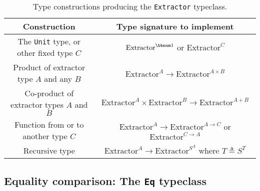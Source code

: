 \begin{table}
\begin{centering}
\begin{tabular}{|c|c|}
\hline 
\textbf{\footnotesize{}Construction} & \textbf{\footnotesize{}Type signature to implement}\tabularnewline
\hline 
\hline 
{\footnotesize{}The }\lstinline!Unit!{\footnotesize{} type, or other
fixed type $C$} & {\footnotesize{}$\text{Extractor}^{\bbnum 1}$ or $\text{Extractor}^{C}$}\tabularnewline
\hline 
{\footnotesize{}Product of extractor type $A$ and any $B$} & {\footnotesize{}$\text{Extractor}^{A}\rightarrow\text{Extractor}^{A\times B}$}\tabularnewline
\hline 
{\footnotesize{}Co-product of extractor types $A$ and $B$} & {\footnotesize{}$\text{Extractor}^{A}\times\text{Extractor}^{B}\rightarrow\text{Extractor}^{A+B}$}\tabularnewline
\hline 
{\footnotesize{}Function from or to another type $C$} & {\footnotesize{}$\text{Extractor}^{A}\rightarrow\text{Extractor}^{A\rightarrow C}$
or $\text{Extractor}^{C\rightarrow A}$}\tabularnewline
\hline 
{\footnotesize{}Recursive type} & {\footnotesize{}$\text{Extractor}^{A}\rightarrow\text{Extractor}^{S^{A}}$
where $T\triangleq S^{T}$}\tabularnewline
\hline 
\end{tabular}
\par\end{centering}
\caption{Type constructions producing the \lstinline!Extractor! typeclass.\label{tab:Type-constructions-for-Extractor}}
\end{table}


\subsection{Equality comparison: The \texttt{Eq} typeclass\label{subsec:The-Eq-typeclass}}

